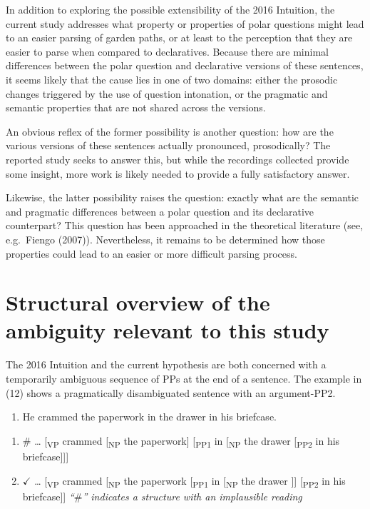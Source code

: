 \documentclass[11pt,oneside]{book}
\providecommand{\tightlist}{%
  \setlength{\itemsep}{0pt}\setlength{\parskip}{0pt}}
\begin{document}
In addition to exploring the possible extensibility of the 2016 Intuition, the current study addresses what property or properties of polar questions might lead to an easier parsing of garden paths, or at least to the perception that they are easier to parse when compared to declaratives. Because there are minimal differences between the polar question and declarative versions of these sentences, it seems likely that the cause lies in one of two domains: either the prosodic changes triggered by the use of question intonation, or the pragmatic and semantic properties that are not shared across the versions.

An obvious reflex of the former possibility is another question: how are the various versions of these sentences actually pronounced, prosodically? The reported study seeks to answer this, but while the recordings collected provide some insight, more work is likely needed to provide a fully satisfactory answer.

Likewise, the latter possibility raises the question: exactly what are the semantic and pragmatic differences between a polar question and its declarative counterpart? This question has been approached in the theoretical literature (see, e.g.~Fiengo (2007)). Nevertheless, it remains to be determined how those properties could lead to an easier or more difficult parsing process.

\hypertarget{mech}{%
\section{Structural overview of the ambiguity relevant to this study}\label{mech}}

The 2016 Intuition and the current hypothesis are both concerned with a temporarily ambiguous sequence of PPs at the end of a sentence. The example in (12) shows a pragmatically disambiguated sentence with an argument-PP2.

\begin{enumerate}
\def\labelenumi{(\arabic{enumi})}
\setcounter{enumi}{11}
\tightlist
\item
  He crammed the paperwork in the drawer in his briefcase.
\end{enumerate}

\begin{enumerate}
\def\labelenumi{\alph{enumi})}
\tightlist
\item
  \(\#\) \ldots{} {[}\textsubscript{VP} crammed {[}\textsubscript{NP} the paperwork{]} {[}\textsubscript{PP1} in {[}\textsubscript{NP} the drawer {[}\textsubscript{PP2} in his briefcase{]}{]}{]}
\item
  \(\checkmark\) \ldots{} {[}\textsubscript{VP} crammed {[}\textsubscript{NP} the paperwork {[}\textsubscript{PP1} in {[}\textsubscript{NP} the drawer {]}{]} {[}\textsubscript{PP2} in his briefcase{]}{]} \linebreak\nopagebreak
  \emph{``\(\#\)'' indicates a structure with an implausible reading}
\end{enumerate}
\end{document}
